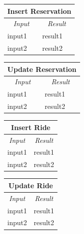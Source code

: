 \documentclass[english]{article}
\begin{document}
\begin{center}
	\begin{tabular}{ | m{6cm} | m{6cm} | }
		\hline
		\multicolumn{2}{|c|}{\textbf{Insert Reservation}} \\
		\hline
		\multicolumn{1}{|c|}{\textit{Input}} & \multicolumn{1}{c|}{\textit{Result}} \\
		\hline
		input1 & result1 \\
		\hline
		input2 & result2 \\
		\hline
	\end{tabular}
\end{center}

\begin{center}
	\begin{tabular}{ | m{6cm} | m{6cm} | }
		\hline
		\multicolumn{2}{|c|}{\textbf{Update Reservation}} \\
		\hline
		\multicolumn{1}{|c|}{\textit{Input}} & \multicolumn{1}{c|}{\textit{Result}} \\
		\hline
		input1 & result1 \\
		\hline
		input2 & result2 \\
		\hline
	\end{tabular}
\end{center}

\begin{center}
	\begin{tabular}{ | m{6cm} | m{6cm} | }
		\hline
		\multicolumn{2}{|c|}{\textbf{Insert Ride}} \\
		\hline
		\multicolumn{1}{|c|}{\textit{Input}} & \multicolumn{1}{c|}{\textit{Result}} \\
		\hline
		input1 & result1 \\
		\hline
		input2 & result2 \\
		\hline
	\end{tabular}
\end{center}


\begin{center}
	\begin{tabular}{ | m{6cm} | m{6cm} | }
		\hline
		\multicolumn{2}{|c|}{\textbf{Update Ride}} \\
		\hline
		\multicolumn{1}{|c|}{\textit{Input}} & \multicolumn{1}{c|}{\textit{Result}} \\
		\hline
		input1 & result1 \\
		\hline
		input2 & result2 \\
		\hline
	\end{tabular}
\end{center}
\end{document}
